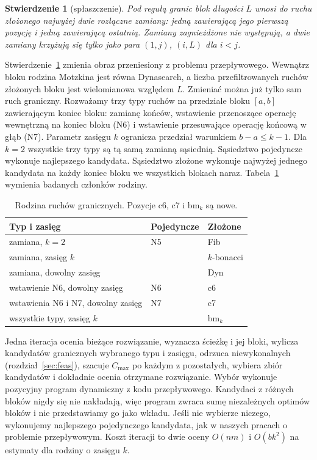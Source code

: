 \documentclass[10pt,twocolumn]{article}
\newtheorem{proposition}{Stwierdzenie}
\newcommand{\Cmax}{C_{\max}}
\begin{document}
\begin{proposition}[spłaszczenie]\label{pr:flat}
Pod regułą granic blok długości $L$ wnosi do ruchu złożonego najwyżej
dwie rozłączne zamiany: jedną zawierającą jego pierwszą pozycję i jedną
zawierającą ostatnią. Zamiany zagnieżdżone nie występują, a dwie zamiany
krzyżują się tylko jako para $(1,j)$, $(i,L)$ dla $i<j$.
\end{proposition}

Stwierdzenie~\ref{pr:flat} zmienia obraz przeniesiony z problemu
przepływowego. Wewnątrz bloku rodzina Motzkina jest równa Dynasearch,
a liczba przefiltrowanych ruchów złożonych bloku jest wielomianowa
względem $L$. Zmieniać można już tylko sam ruch graniczny. Rozważamy trzy
typy ruchów na przedziale bloku $[a,b]$ zawierającym koniec bloku:
zamianę końców, wstawienie przenoszące operację wewnętrzną na koniec
bloku (N6) i wstawienie przesuwające operację końcową w głąb (N7).
Parametr zasięgu $k$ ogranicza przedział warunkiem $b-a\le k-1$. Dla
$k=2$ wszystkie trzy typy są tą samą zamianą sąsiednią. Sąsiedztwo
pojedyncze wykonuje najlepszego kandydata. Sąsiedztwo złożone wykonuje
najwyżej jednego kandydata na każdy koniec bloku we wszystkich blokach
naraz. Tabela~\ref{tab:family} wymienia badanych członków rodziny.

\begin{table}[t]
\centering\small
\begin{tabular}{@{}lll@{}}
\toprule
Typ i zasięg & Pojedyncze & Złożone \\
\midrule
zamiana, $k=2$ & N5 & Fib \\
zamiana, zasięg $k$ & & $k$-bonacci \\
zamiana, dowolny zasięg & & Dyn \\
wstawienie N6, dowolny zasięg & N6 & c6 \\
wstawienia N6 i N7, dowolny zasięg & N7 & c7 \\
wszystkie typy, zasięg $k$ & & bm$_k$ \\
\bottomrule
\end{tabular}
\caption{Rodzina ruchów granicznych. Pozycje c6, c7 i bm$_k$ są nowe.}
\label{tab:family}
\end{table}

Jedna iteracja ocenia bieżące rozwiązanie, wyznacza ścieżkę i jej bloki,
wylicza kandydatów granicznych wybranego typu i zasięgu, odrzuca
niewykonalnych (rozdział~\ref{sec:feas}), szacuje $\Cmax$ po każdym
z pozostałych, wybiera zbiór kandydatów i dokładnie ocenia otrzymane
rozwiązanie. Wybór wykonuje pozycyjny program dynamiczny z kodu
przepływowego. Kandydaci z różnych bloków nigdy się nie nakładają, więc
program zwraca sumę niezależnych optimów bloków i nie przedstawiamy go
jako wkładu. Jeśli nie wybierze niczego, wykonujemy najlepszego
pojedynczego kandydata, jak w naszych pracach o problemie przepływowym.
Koszt iteracji to dwie oceny $O(nm)$ i $O(bk^2)$ na estymaty dla rodziny
o zasięgu $k$.
\end{document}
